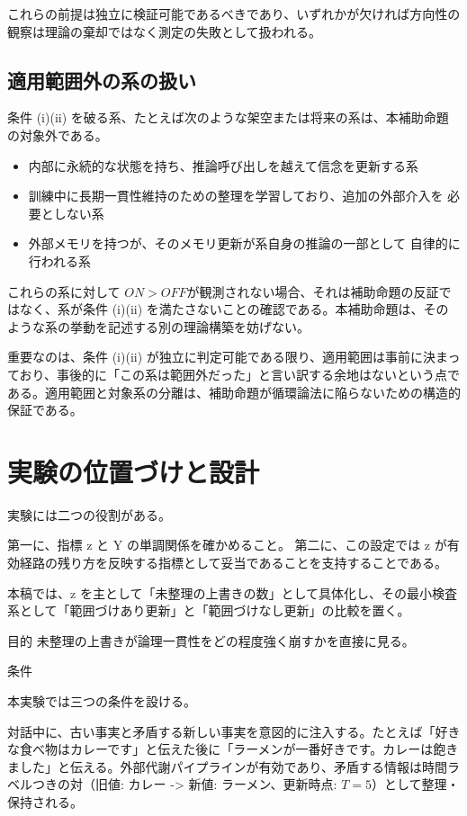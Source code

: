 \documentclass[12pt,a4paper]{article}
\begin{document}
これらの前提は独立に検証可能であるべきであり、いずれかが欠ければ方向性の観察は理論の棄却ではなく測定の失敗として扱われる。

\subsection{適用範囲外の系の扱い}\label{ux9069ux7528ux7bc4ux56f2ux5916ux306eux7cfbux306eux6271ux3044}

条件 (i)(ii) を破る系、たとえば次のような架空または将来の系は、本補助命題の対象外である。

\begin{itemize}
\tightlist
\item
  内部に永続的な状態を持ち、推論呼び出しを越えて信念を更新する系
\item
  訓練中に長期一貫性維持のための整理を学習しており、追加の外部介入を 必要としない系
\item
  外部メモリを持つが、そのメモリ更新が系自身の推論の一部として 自律的に行われる系
\end{itemize}

これらの系に対して \(ON > OFF\)が観測されない場合、それは補助命題の反証ではなく、系が条件 (i)(ii) を満たさないことの確認である。本補助命題は、そのような系の挙動を記述する別の理論構築を妨げない。

重要なのは、条件 (i)(ii) が独立に判定可能である限り、適用範囲は事前に決まっており、事後的に「この系は範囲外だった」と言い訳する余地はないという点である。適用範囲と対象系の分離は、補助命題が循環論法に陥らないための構造的保証である。

\section{実験の位置づけと設計}\label{ux5b9fux9a13ux306eux4f4dux7f6eux3065ux3051ux3068ux8a2dux8a08}

実験には二つの役割がある。

第一に、指標 z と Y の単調関係を確かめること。 第二に、この設定では z が有効経路の残り方を反映する指標として妥当であることを支持することである。

本稿では、z を主として「未整理の上書きの数」として具体化し、その最小検査系として「範囲づけあり更新」と「範囲づけなし更新」の比較を置く。

目的 未整理の上書きが論理一貫性をどの程度強く崩すかを直接に見る。

条件

本実験では三つの条件を設ける。

\begin{definition}
対話中に、古い事実と矛盾する新しい事実を意図的に注入する。たとえば「好きな食べ物はカレーです」と伝えた後に「ラーメンが一番好きです。カレーは飽きました」と伝える。外部代謝パイプラインが有効であり、矛盾する情報は時間ラベルつきの対（旧値: カレー -> 新値: ラーメン、更新時点: $T=5$）として整理・保持される。
\end{definition}
\end{document}
